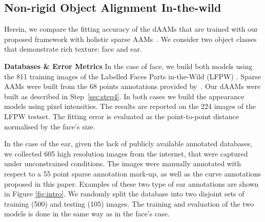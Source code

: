 \subsection{Non-rigid Object Alignment In-the-wild}
\label{exp:daam_benchmark}
Herein, we compare the fitting accuracy of the dAAMs that are trained with our proposed framework with holistic sparse AAMs~\cite{Cootes2001,Matthews2004}. We consider two object classes that demonstrate rich texture: face and ear.

\noindent\textbf{Databases \& Error Metrics} In the case of face, we build both models using the 811 training images of the Labelled Faces Parts in-the-Wild (LFPW) \cite{belhumeur2013localizing}. Sparse AAMs were built from the 68 points annotations provided by~\cite{sagonas_iccv_300w_2013}. Our dAAMs were built as described in Step~\ref{sec:step4}. In both cases we build the appearance models using pixel intensities. The results are reported on the 224 images of the LFPW testset. The fitting error is evaluated as the point-to-point distance normalised by the face's size.

In the case of the ear, given the lack of publicly available annotated databases, we collected 605 high resolution images from the internet, that were captured under unconstrained conditions. The images were manually annotated with respect to a 55 point sparse annotation mark-up, as well as the curve annotations proposed in this paper. Examples of these two type of ear annotations are shown in Figure \ref{fig:intro}. We randomly split the database into two disjoint sets of training (500) and testing (105) images. The training and evaluation of the two models is done in the same way as in the face's case.

